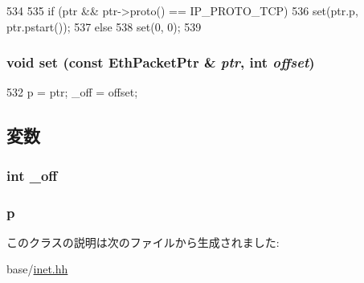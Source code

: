 \begin{DoxyCode}
534     {
535         if (ptr && ptr->proto() == IP_PROTO_TCP)
536             set(ptr.p, ptr.pstart());
537         else
538             set(0, 0);
539     }
\end{DoxyCode}
\hypertarget{classNet_1_1TcpPtr_a777f6c709e0743045ba3536e4e184d09}{
\subsubsection[{set}]{\setlength{\rightskip}{0pt plus 5cm}void set (const {\bf EthPacketPtr} \& {\em ptr}, \/  int {\em offset})}}
\label{classNet_1_1TcpPtr_a777f6c709e0743045ba3536e4e184d09}



\begin{DoxyCode}
532 { p = ptr; _off = offset; }
\end{DoxyCode}


\subsection{変数}
\hypertarget{classNet_1_1TcpPtr_ae333e6fee474f238b35b4bf86e60a8ee}{
\subsubsection[{\_\-off}]{\setlength{\rightskip}{0pt plus 5cm}int {\bf \_\-off}}}
\label{classNet_1_1TcpPtr_ae333e6fee474f238b35b4bf86e60a8ee}
\hypertarget{classNet_1_1TcpPtr_a764b18a7236ca83fd4bd750516da7d09}{
\subsubsection[{p}]{ {\bf p}}}
\label{classNet_1_1TcpPtr_a764b18a7236ca83fd4bd750516da7d09}


このクラスの説明は次のファイルから生成されました:\begin{DoxyCompactItemize}
\item 
base/\hyperlink{inet_8hh}{inet.hh}\end{DoxyCompactItemize}
